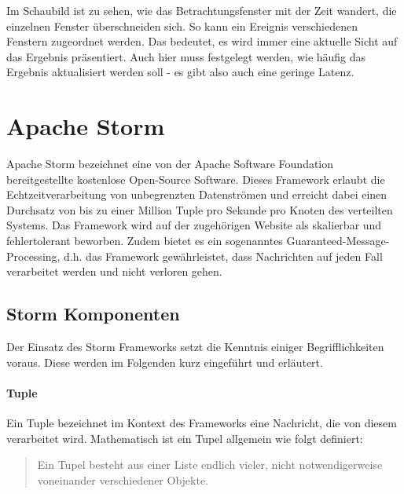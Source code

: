 \documentclass[a4paper,11pt]{scrartcl}
\begin{document}
  Im Schaubild ist zu sehen, wie das Betrachtungsfenster mit der Zeit
  wandert, die einzelnen Fenster überschneiden sich. So kann ein
  Ereignis verschiedenen Fenstern zugeordnet werden. Das bedeutet, es
  wird immer eine aktuelle Sicht auf das Ergebnis präsentiert. Auch
  hier muss festgelegt werden, wie häufig das Ergebnis aktualisiert
  werden soll - es gibt also auch eine geringe Latenz.





  \section{Apache Storm}

  Apache Storm bezeichnet eine von der Apache Software Foundation
  bereitgestellte kostenlose Open-Source Software. Dieses Framework
  erlaubt die Echtzeitverarbeitung von unbegrenzten Datenströmen und
  erreicht dabei einen Durchsatz von bis zu einer Million Tuple pro
  Sekunde pro Knoten des verteilten Systems. Das Framework wird auf
  der zugehörigen Website als skalierbar und fehlertolerant beworben.
  Zudem bietet es ein sogenanntes Guaranteed-Message-Processing, d.h.
  das Framework gewährleistet, dass Nachrichten auf jeden Fall
  verarbeitet werden und nicht verloren gehen.\cite{apachestorm}

  \subsection{Storm Komponenten}

  Der Einsatz des Storm Frameworks setzt die Kenntnis einiger
  Begrifflichkeiten voraus. Diese werden im Folgenden kurz eingeführt
  und erläutert.\cite[S.~53ff.]{stormpresentation2011}

  \paragraph{Tuple}
  Ein Tuple bezeichnet im Kontext des Frameworks eine Nachricht, die
  von diesem verarbeitet wird. Mathematisch ist ein Tupel allgemein wie folgt
  definiert:
  \begin{quote}
    Ein Tupel besteht aus einer Liste endlich vieler, nicht
    notwendigerweise voneinander verschiedener Objekte.
  \end{quote}
\end{document}
